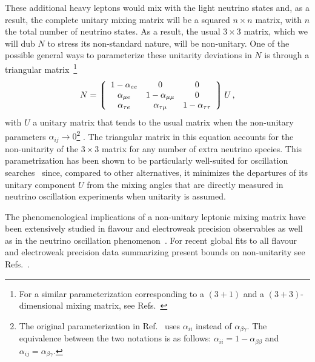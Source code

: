 These additional heavy leptons would mix with the light neutrino
states and, as a result, the complete unitary mixing matrix will be a
squared $n \times n$ matrix, with $n$ the total number of neutrino
states. As a result, the usual $3\times 3$  matrix, which we will dub $N$ to stress its non-standard nature, will be
non-unitary. One of the possible general ways to parameterize these unitarity deviations in $N$ is through a triangular matrix~\cite{Escrihuela:2015wra}\footnote{For a similar parameterization corresponding to a $(3+1)$ and a $(3+3)$-dimensional mixing matrix,  see Refs.~\cite{Xing:2007zj,Xing:2011ur}}
 \begin{equation}
  N = 
 \left\lgroup
 \begin{array}{ccc} 
 1-\alpha_{ee} & 0 & 0 \\
 \alpha_{\mu e} & 1-\alpha_{\mu \mu} & 0 \\
  \alpha_{\tau e} & \alpha_{\tau \mu} & 1-\alpha_{\tau \tau}
 \end{array}
 \right \rgroup U \,,
 \label{eq:triangular}
 \end{equation}
with $U$ a unitary matrix that tends to the usual  matrix when the non-unitary parameters $\alpha_{ij} \rightarrow 0$\footnote{The original parameterization in Ref.~\cite{Escrihuela:2015wra} uses $\alpha_{ii}$ instead of $\alpha_{\beta\gamma}$. The equivalence between the two notations is as follows: $\alpha_{ii} = 1-\alpha_{\beta\beta}$ and $\alpha_{ij} = \alpha_{\beta\gamma}$.} .
%
 The triangular
matrix in this equation accounts for the non-unitarity of the $3\times 3$ matrix for any number of extra neutrino species. This parametrization has been shown to be particularly well-suited for oscillation searches~\cite{Escrihuela:2015wra,Blennow:2016jkn} since, compared to other alternatives, it minimizes the departures of its unitary component $U$ from the mixing angles that are directly measured in neutrino oscillation experiments when unitarity is assumed.

The phenomenological implications of a non-unitary leptonic mixing matrix have been extensively studied in flavour and electroweak precision observables as well as in the neutrino oscillation phenomenon~\cite{Shrock:1980vy,Schechter:1980gr,Shrock:1980ct,Shrock:1981wq,Langacker:1988ur,Bilenky:1992wv,Nardi:1994iv,Tommasini:1995ii,Antusch:2006vwa,FernandezMartinez:2007ms,Antusch:2008tz,Biggio:2008in,Antusch:2009pm,Forero:2011pc,Alonso:2012ji,Antusch:2014woa,Abada:2015trh,Fernandez-Martinez:2015hxa,Escrihuela:2015wra,Parke:2015goa,Miranda:2016wdr,Fong:2016yyh,Escrihuela:2016ube}. For recent global fits to all flavour and electroweak precision data summarizing present bounds on non-unitarity see Refs.~\cite{Antusch:2014woa,Fernandez-Martinez:2016lgt}. 

